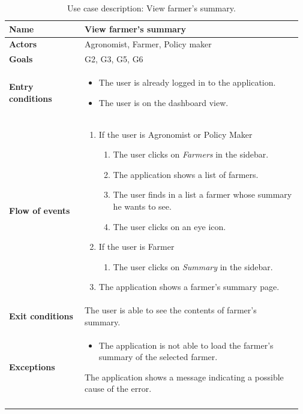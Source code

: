 \begin{longtable}{@{}p{0.25\linewidth} p{0.72\linewidth}@{}}
    \toprule
	\textbf{Name}               & View farmer's summary\\
	\midrule
	\textbf{Actors}             & Agronomist, Farmer, Policy maker\\
	\midrule
	\textbf{Goals}              & G2, G3, G5, G6 \\
	\midrule
	
	\textbf{Entry conditions}   & \begin{itemize}[leftmargin=.4cm,noitemsep,topsep=0pt,before=\vspace{-3mm},after=\vspace{-4mm}]
	    \item The user is already logged in to the application.
	    \item The user is on the dashboard view.
	\end{itemize}\\
	\midrule
	
	\textbf{Flow of events}     & \begin{enumerate}[leftmargin=.4cm,noitemsep,topsep=0pt,before=\vspace{-3mm},after=\vspace{-4mm}]
	    \item If the user is Agronomist or Policy Maker
	    \begin{enumerate}[noitemsep]
	        \item The user clicks on \textit{Farmers} in the sidebar.
	        \item The application shows a list of farmers.
	        \item The user finds in a list a farmer whose summary he wants to see.
	        \item The user clicks on an eye icon.
	    \end{enumerate}
	    \item If the user is Farmer
	    \begin{enumerate}[noitemsep]
	        \item The user clicks on \textit{Summary} in the sidebar.
	    \end{enumerate}
	    \item The application shows a farmer's summary page.
	\end{enumerate}\\
	\midrule
	\textbf{Exit conditions}    & The user is able to see the contents of farmer's summary. \\
	\midrule
	
	\textbf{Exceptions}         & 
    \begin{itemize}[leftmargin=.4cm,noitemsep,topsep=0pt,before=\vspace{-3mm}]
	   \item The application is not able to load the farmer's summary of the selected farmer.
	\end{itemize}
	The application shows a message indicating a possible cause of the error.
	\\\bottomrule
	\caption{Use case description: View farmer's summary.} 
\end{longtable}


